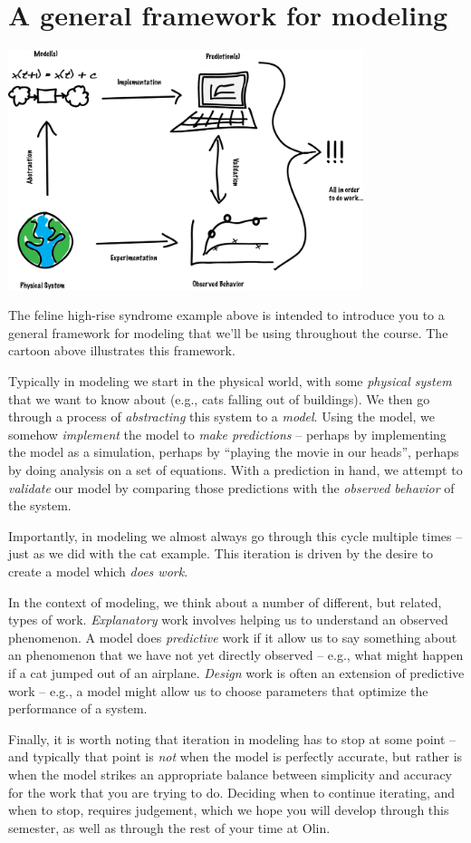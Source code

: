 \section{A general framework for modeling}


\centerline{\includegraphics[height=7cm]{figs/LabeledModSimDiagram}}

The feline high-rise syndrome example above is intended to introduce you to a general framework for modeling that we'll be using throughout the course.  The cartoon above illustrates this framework. 

Typically in modeling we start in the physical world, with some {\it physical system} that we want to know about (e.g., cats falling out of buildings).  We then go through a process of {\it abstracting} this system to a {\it model}.  Using the model, we somehow {\it implement} the model to {\it make predictions} -- perhaps by implementing the model as a simulation, perhaps by ``playing the movie in our heads'', perhaps by doing analysis on a set of equations.  With a prediction in hand, we attempt to {\it validate} our model by comparing those predictions with the {\it observed behavior} of the system. 

Importantly, in modeling we almost always go through this cycle multiple times -- just as we did with the cat example.  This iteration is driven by the desire to create a model which {\it does work}.   

In the context of modeling, we think about a number of different, but related, types of work.  {\it Explanatory} work involves helping us to understand an observed phenomenon.  A model does {\it predictive} work if it allow us to say something about an phenomenon that we have not yet directly observed -- e.g., what might happen if a cat jumped out of an airplane.  {\it Design} work is often an extension of predictive work -- e.g., a model might allow us to choose parameters that optimize the performance of a system.

Finally, it is worth noting that iteration in modeling has to stop at some point -- and typically that point is {\it not} when the model is perfectly accurate, but rather is when the model strikes an appropriate balance between simplicity and accuracy for the work that you are trying to do.  Deciding when to continue iterating, and when to stop, requires judgement, which we hope you will develop through this semester, as well as through the rest of your time at Olin.




